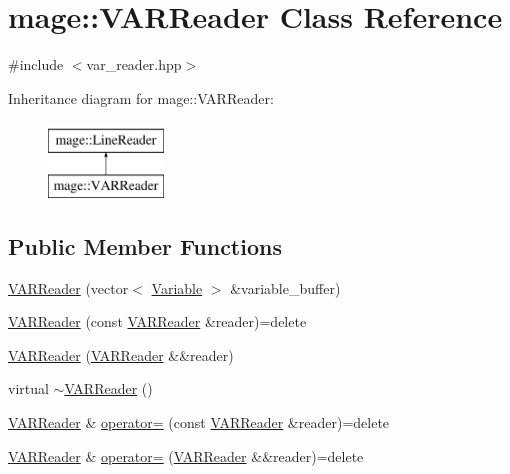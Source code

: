 \hypertarget{classmage_1_1_v_a_r_reader}{}\section{mage\+:\+:V\+A\+R\+Reader Class Reference}
\label{classmage_1_1_v_a_r_reader}


{\ttfamily \#include $<$var\+\_\+reader.\+hpp$>$}

Inheritance diagram for mage\+:\+:V\+A\+R\+Reader\+:\begin{figure}[H]
\begin{center}
\leavevmode
\includegraphics[height=2.000000cm]{classmage_1_1_v_a_r_reader}
\end{center}
\end{figure}
\subsection*{Public Member Functions}
\begin{DoxyCompactItemize}
\item 
\hyperlink{classmage_1_1_v_a_r_reader_a3c38bbcce8a6983163a8335560f9814b}{V\+A\+R\+Reader} (vector$<$ \hyperlink{structmage_1_1_variable}{Variable} $>$ \&variable\+\_\+buffer)
\item 
\hyperlink{classmage_1_1_v_a_r_reader_a42faf193700b82813727aa943ded3940}{V\+A\+R\+Reader} (const \hyperlink{classmage_1_1_v_a_r_reader}{V\+A\+R\+Reader} \&reader)=delete
\item 
\hyperlink{classmage_1_1_v_a_r_reader_a04ff7eec105ce7c0700e0a2e7ef740f3}{V\+A\+R\+Reader} (\hyperlink{classmage_1_1_v_a_r_reader}{V\+A\+R\+Reader} \&\&reader)
\item 
virtual \hyperlink{classmage_1_1_v_a_r_reader_ad6d33cedc71285380eeda74e45e4a1d2}{$\sim$\+V\+A\+R\+Reader} ()
\item 
\hyperlink{classmage_1_1_v_a_r_reader}{V\+A\+R\+Reader} \& \hyperlink{classmage_1_1_v_a_r_reader_a8ea4a08a1d66a8d177ac6e30ef13722c}{operator=} (const \hyperlink{classmage_1_1_v_a_r_reader}{V\+A\+R\+Reader} \&reader)=delete
\item 
\hyperlink{classmage_1_1_v_a_r_reader}{V\+A\+R\+Reader} \& \hyperlink{classmage_1_1_v_a_r_reader_a7cf3c6fe1e27377d4a6ea914a11bc382}{operator=} (\hyperlink{classmage_1_1_v_a_r_reader}{V\+A\+R\+Reader} \&\&reader)=delete
\end{DoxyCompactItemize}
